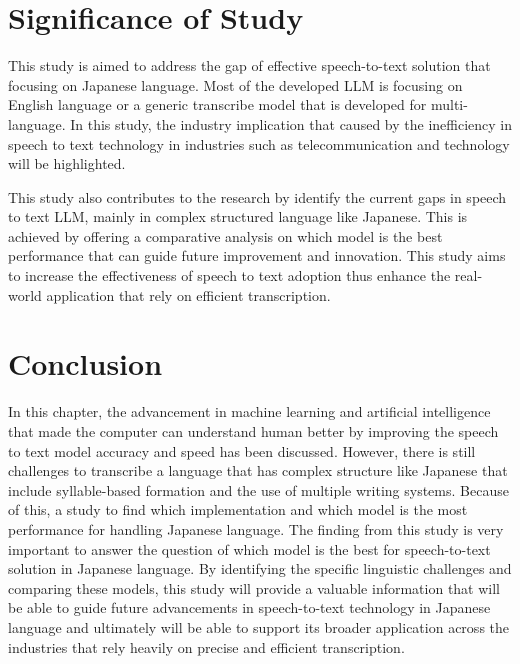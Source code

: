 \section{Significance of Study}
This study is aimed to address the gap of effective speech-to-text solution that focusing on Japanese language. Most of the developed LLM is focusing on English language or a generic transcribe model that is developed for multi-language. In this study, the industry implication that caused by the inefficiency in speech to text technology in industries such as telecommunication and technology will be highlighted. 

This study also contributes to the research by identify the current gaps in speech to text LLM, mainly in complex structured language like Japanese. This is achieved by offering a comparative analysis on which model is the best performance that can guide future improvement and innovation. This study aims to increase the effectiveness of speech to text adoption thus enhance the real-world application that rely on efficient transcription. 

\section{Conclusion}
In this chapter, the advancement in machine learning and artificial intelligence that made the computer can understand human better by improving the speech to text model accuracy and speed has been discussed. However, there is still challenges to transcribe a language that has complex structure like Japanese that include syllable-based formation and the use of multiple writing systems. Because of this, a study to find which implementation and which model is the most performance for handling Japanese language. The finding from this study is very important to answer the question of which model is the best for speech-to-text solution in Japanese language. By identifying the specific linguistic challenges and comparing these models, this study will provide a valuable information that will be able to guide future advancements in speech-to-text technology in Japanese language and ultimately will be able to support its broader application across the industries that rely heavily on precise and efficient transcription.


